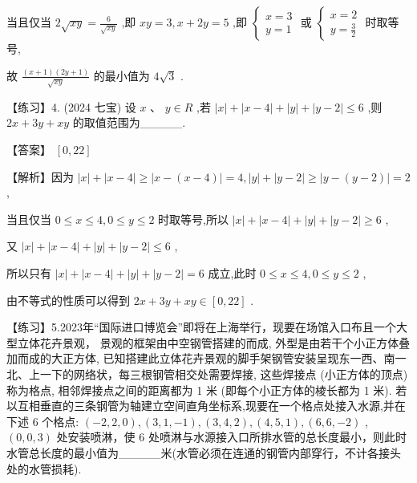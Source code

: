 \documentclass[10pt]{article}
\begin{document}
当且仅当 \(2\sqrt{xy} = \frac{6}{\sqrt{xy}}\) ,即 \({xy} = 3,x + {2y} = 5\) ,即 \(\left\{  \begin{array}{l} x = 3 \\  y = 1 \end{array}\right.\) 或 \(\left\{  \begin{array}{l} x = 2 \\  y = \frac{3}{2} \end{array}\right.\) 时取等号,

故 \(\frac{\left( {x + 1}\right) \left( {{2y} + 1}\right) }{\sqrt{xy}}\) 的最小值为 \(4\sqrt{3}\) .

【练习】4. (2024 七宝) 设 \(x\text{ 、 }y \in  R\) ,若 \(\left| x\right|  + \left| {x - 4}\right|  + \left| y\right|  + \left| {y - 2}\right|  \leq  6\) ,则 \({2x} + {3y} + {xy}\) 的取值范围为\_\_\_\_\_.

【答案】 \(\left\lbrack  {0,{22}}\right\rbrack\)

【解析】因为 \(\left| x\right|  + \left| {x - 4}\right|  \geq  \left| {x - \left( {x - 4}\right) }\right|  = 4,\left| y\right|  + \left| {y - 2}\right|  \geq  \left| {y - \left( {y - 2}\right) }\right|  = 2\) ,

当且仅当 \(0 \leq  x \leq  4,0 \leq  y \leq  2\) 时取等号,所以 \(\left| x\right|  + \left| {x - 4}\right|  + \left| y\right|  + \left| {y - 2}\right|  \geq  6\) ,

又 \(\left| x\right|  + \left| {x - 4}\right|  + \left| y\right|  + \left| {y - 2}\right|  \leq  6\) ,

所以只有 \(\left| x\right|  + \left| {x - 4}\right|  + \left| y\right|  + \left| {y - 2}\right|  = 6\) 成立,此时 \(0 \leq  x \leq  4,0 \leq  y \leq  2\) ,

由不等式的性质可以得到 \({2x} + {3y} + {xy} \in  \left\lbrack  {0,{22}}\right\rbrack\) .

【练习】5.2023年“国际进口博览会”即将在上海举行，现要在场馆入口布且一个大型立体花卉景观， 景观的框架由中空钢管搭建的而成, 外型是由若干个小正方体叠加而成的大正方体, 已知搭建此立体花卉景观的脚手架钢管安装呈现东一西、南一北、上一下的网络状，每三根钢管相交处需要焊接, 这些焊接点 (小正方体的顶点) 称为格点, 相邻焊接点之间的距离都为 1 米 (即每个小正方体的棱长都为 1 米). 若以互相垂直的三条钢管为轴建立空间直角坐标系,现要在一个格点处接入水源,并在下述 6 个格点: \(\left( {-2,2,0}\right) ,\left( {3,1, - 1}\right) ,\left( {3,4,2}\right) ,\left( {4,5,1}\right) ,\left( {6,6, - 2}\right)\) , \(\left( {0,0,3}\right)\) 处安装喷淋，使 6 处喷淋与水源接入口所排水管的总长度最小，则此时水管总长度的最小值为\_\_\_\_\_米(水管必须在连通的钢管内部穿行，不计各接头处的水管损耗).
\end{document}

